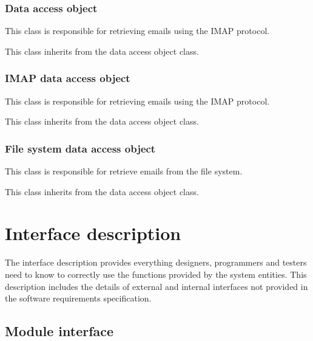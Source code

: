 \subsubsection{Data access object}
  \begin{my_desc}
   \item[Purpose] This class is responsible for retrieving emails using the IMAP protocol.
   \item[Function] This class inherits from the data access object class.
  \end{my_desc}

\subsubsection{IMAP data access object}
  \begin{my_desc}
   \item[Purpose] This class is responsible for retrieving emails using the IMAP protocol.
   \item[Function] This class inherits from the data access object class.
  \end{my_desc}


\subsubsection{File system data access object}
  \begin{my_desc}
   \item[Purpose] This class is responsible for retrieve emails from the file system.
   \item[Function] This class inherits from the data access object class.
  \end{my_desc}


\section{Interface description}
The interface description provides everything designers, programmers and testers need to know to correctly use the functions provided by the system entities. This description includes the details of external and internal interfaces not provided in the software requirements speciﬁcation.

\subsection{Module interface}
